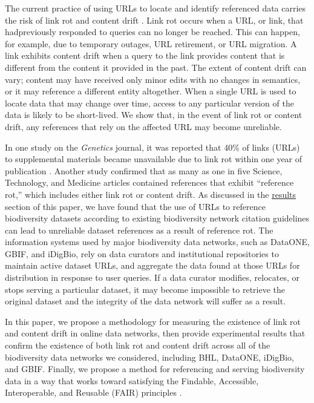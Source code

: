 The current practice of using URLs to locate and identify referenced data carries the risk of link rot and content drift \citep{Klein_2014}. Link rot occurs when a URL, or link, that hadpreviously responded to queries can no longer be reached. This can happen, for example, due to temporary outages, URL retirement, or URL migration. A link exhibits content drift when a query to the link provides content that is different from the content it provided in the past. The extent of content drift can vary; content may have received only minor edits with no changes in semantics, or it may reference a different entity altogether. When a single URL is used to locate data that may change over time, access to any particular version of the data is likely to be short-lived. We show that, in the event of link rot or content drift, any references that rely on the affected URL may become unreliable.

In one study on the \textit{Genetics} journal, it was reported that 40\% of links (URLs) to supplemental materials became unavailable due to link rot within one year of publication \citep{Vision_2010}. Another study \citep{Klein_2014} confirmed that as many as one in five Science, Technology, and Medicine articles contained references that exhibit ``reference rot,'' which includes either link rot or content drift. As discussed in the \hyperref[sec:results]{results} section of this paper, we have found that the use of URLs to reference biodiversity datasets according to existing biodiversity network citation guidelines  can lead to unreliable dataset references as a result of reference rot. The information systems used by major biodiversity data networks, such as DataONE, GBIF, and iDigBio, rely on data curators and institutional repositories to maintain active dataset URLs, and aggregate the data found at those URLs for distribution in response to user queries. If a data curator modifies, relocates, or stops serving a particular dataset, it may become impossible to retrieve the original dataset and the integrity of the data network will suffer as a result.

In this paper, we propose a methodology for measuring the existence of link rot and content drift in online data networks, then provide experimental results that confirm the existence of both link rot and content drift across all of the biodiversity data networks we considered, including BHL, DataONE, iDigBio, and GBIF. Finally, we propose a method for referencing and serving biodiversity data in a way that works toward satisfying the Findable, Accessible, Interoperable, and Reusable (FAIR) principles \citep{Wilkinson_2016}.



